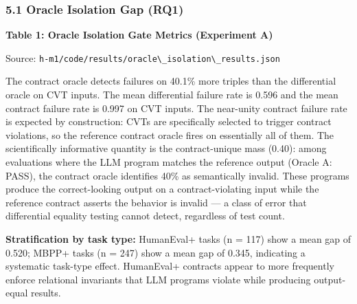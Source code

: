 
\subsubsection{5.1 Oracle Isolation Gap (RQ1)}

\textbf{Table 1: Oracle Isolation Gate Metrics (Experiment A)}

\begin{table}[htbp]
\centering
{}
\end{table}

Source: \texttt{h-m1/code/results/oracle\textbackslash \_isolation\textbackslash \_results.json}

The contract oracle detects failures on 40.1\% more triples than the differential oracle on CVT inputs. The mean differential failure rate is 0.596 and the mean contract failure rate is 0.997 on CVT inputs. The near-unity contract failure rate is expected by construction: CVTs are specifically selected to trigger contract violations, so the reference contract oracle fires on essentially all of them. The scientifically informative quantity is the contract-unique mass (0.40): among evaluations where the LLM program matches the reference output (Oracle A: PASS), the contract oracle identifies 40\% as semantically invalid. These programs produce the correct-looking output on a contract-violating input while the reference contract asserts the behavior is invalid --- a class of error that differential equality testing cannot detect, regardless of test count.

\textbf{Stratification by task type:} HumanEval+ tasks (n = 117) show a mean gap of 0.520; MBPP+ tasks (n = 247) show a mean gap of 0.345, indicating a systematic task-type effect. HumanEval+ contracts appear to more frequently enforce relational invariants that LLM programs violate while producing output-equal results.

